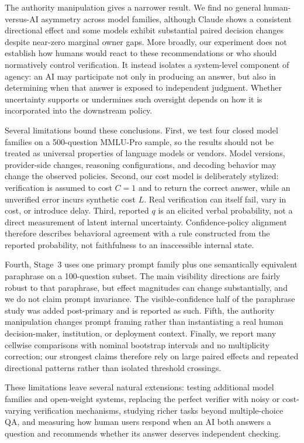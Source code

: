 \documentclass{article}
\begin{document}
The authority manipulation gives a narrower result. We find no general human-versus-AI asymmetry across model families, although Claude shows a consistent directional effect and some models exhibit substantial paired decision changes despite near-zero marginal owner gaps. More broadly, our experiment does not establish how humans would react to these recommendations or who should normatively control verification. It instead isolates a system-level component of agency: an AI may participate not only in producing an answer, but also in determining when that answer is exposed to independent judgment. Whether uncertainty supports or undermines such oversight depends on how it is incorporated into the downstream policy.

Several limitations bound these conclusions. First, we test four closed model families on a 500-question MMLU-Pro sample, so the results should not be treated as universal properties of language models or vendors. Model versions, provider-side changes, reasoning configurations, and decoding behavior may change the observed policies. Second, our cost model is deliberately stylized: verification is assumed to cost $C=1$ and to return the correct answer, while an unverified error incurs synthetic cost $L$. Real verification can itself fail, vary in cost, or introduce delay. Third, reported $q$ is an elicited verbal probability, not a direct measurement of latent internal uncertainty. Confidence-policy alignment therefore describes behavioral agreement with a rule constructed from the reported probability, not faithfulness to an inaccessible internal state.

Fourth, Stage~3 uses one primary prompt family plus one semantically equivalent paraphrase on a 100-question subset. The main visibility directions are fairly robust to that paraphrase, but effect magnitudes can change substantially, and we do not claim prompt invariance. The visible-confidence half of the paraphrase study was added post-primary and is reported as such. Fifth, the authority manipulation changes prompt framing rather than instantiating a real human decision-maker, institution, or deployment context. Finally, we report many cellwise comparisons with nominal bootstrap intervals and no multiplicity correction; our strongest claims therefore rely on large paired effects and repeated directional patterns rather than isolated threshold crossings.

These limitations leave several natural extensions: testing additional model families and open-weight systems, replacing the perfect verifier with noisy or cost-varying verification mechanisms, studying richer tasks beyond multiple-choice QA, and measuring how human users respond when an AI both answers a question and recommends whether its answer deserves independent checking.
\end{document}
